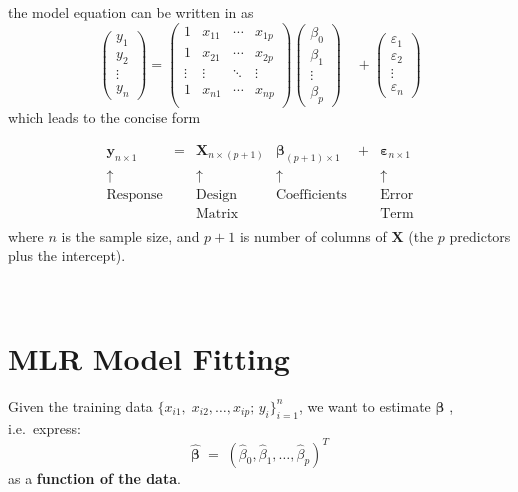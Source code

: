 \documentclass[
]{book}
\begin{document}
the model equation can be written in as
\[\left(\begin{array}{c} 
      y_{1} \\ y_{2} \\ \vdots \\ y_{n}
    \end{array}\right) = \left(\begin{array}{ccccc}
   1&x_{11}& \cdots &x_{1p} \\
   1& x_{21}& \cdots&x_{2p}   \\
   \vdots & \vdots & \ddots & \vdots\\
  1 & x_{n1} & \cdots & x_{np}  \\
    \end{array} \right) \left(\begin{array}{c} 
      \beta_{0} \\ \beta_{1} \\ \vdots \\ \beta_p
    \end{array}\right)\quad + 
\left(\begin{array}{c} 
      \varepsilon_{1} \\ \varepsilon_{2} \\ \vdots \\ \varepsilon_{n}
    \end{array}\right)
  \]
which leads to the concise form

\[
  \begin{array}{cccccc}
\mathbf{y}_{n\times 1} &=&\mathbf{X}_{n\times (p+1)}  &\mathbf{\beta}_{(p+1)\times 1}&+&\mathbf{\varepsilon}_{n\times 1}\\
\uparrow & & \uparrow & \uparrow & & \uparrow\\
\text{Response} &&\text{Design} & \text{Coefficients} & & \text{Error}\\
&&\text{Matrix} & && \text{Term}\\
\end{array}
\]
where \(n\) is the sample size, and \(p+1\) is number of columns of \(\mathbf{X}\) (the \(p\) predictors plus the intercept).

~

\section{MLR Model Fitting}\label{mlr-model-fitting}

Given the training data \(\bigl\{ x_{i1},\; x_{i2}, \ldots, x_{ip};\, y_i\bigr\}_{i=1}^{n}\), we want to estimate \(\mathbf{\beta}\) , i.e.~express:
\[
    \hat{\mathbf{\beta}} \;=\; 
      \left(\hat{\beta}_0,\hat{\beta}_1,\ldots,\hat{\beta}_p\right)^{T}
  \]
as a \textbf{function of the data}.
\end{document}
